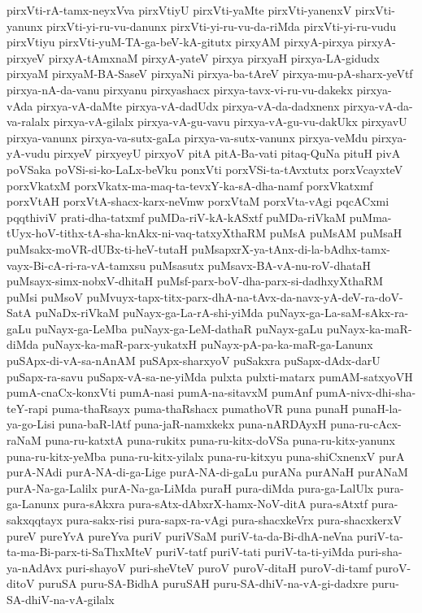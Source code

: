 {pirxVti-rA-tamx-neyxVva
pirxVtiyU
pirxVti-yaMte
pirxVti-yanenxV
pirxVti-yanunx
pirxVti-yi-ru-vu-danunx
pirxVti-yi-ru-vu-da-riMda
pirxVti-yi-ru-vudu
pirxVtiyu
pirxVti-yuM-TA-ga-beV-kA-gitutx
pirxyAM
pirxyA-pirxya
pirxyA-pirxyeV
pirxyA-tAmxnaM
pirxyA-yateV
pirxya
pirxyaH
pirxya-LA-gidudx
pirxyaM
pirxyaM-BA-SaseV
pirxyaNi
pirxya-ba-tAreV
pirxya-mu-pA-sharx-yeVtf
pirxya-nA-da-vanu
pirxyanu
pirxyashacx
pirxya-tavx-vi-ru-vu-dakekx
pirxya-vAda
pirxya-vA-daMte
pirxya-vA-dadUdx
pirxya-vA-da-dadxnenx
pirxya-vA-da-va-ralalx
pirxya-vA-gilalx
pirxya-vA-gu-vavu
pirxya-vA-gu-vu-dakUkx
pirxyavU
pirxya-vanunx
pirxya-va-sutx-gaLa
pirxya-va-sutx-vanunx
pirxya-veMdu
pirxya-yA-vudu
pirxyeV
pirxyeyU
pirxyoV
pitA
pitA-Ba-vati
pitaq-QuNa
pituH
pivA
poVSaka
poVSi-si-ko-LaLx-beVku
ponxVti
porxVSi-ta-tAvxtutx
porxVcayxteV
porxVkatxM
porxVkatx-ma-maq-ta-tevxY-ka-sA-dha-namf
porxVkatxmf
porxVtAH
porxVtA-shacx-karx-neVmw
porxVtaM
porxVta-vAgi
pqcACxmi
pqqthiviV
prati-dha-tatxmf
puMDa-riV-kA-kASxtf
puMDa-riVkaM
puMma-tUyx-hoV-tithx-tA-sha-knAkx-ni-vaq-tatxyXthaRM
puMsA
puMsAM
puMsaH
puMsakx-moVR-dUBx-ti-heV-tutaH
puMsapxrX-ya-tAnx-di-la-bAdhx-tamx-vayx-Bi-cA-ri-ra-vA-tamxsu
puMsasutx
puMsavx-BA-vA-nu-roV-dhataH
puMsayx-simx-nobxV-dhitaH
puMsf-parx-boV-dha-parx-si-dadhxyXthaRM
puMsi
puMsoV
puMvuyx-tapx-titx-parx-dhA-na-tAvx-da-navx-yA-deV-ra-doV-SatA
puNaDx-riVkaM
puNayx-ga-La-rA-shi-yiMda
puNayx-ga-La-saM-sAkx-ra-gaLu
puNayx-ga-LeMba
puNayx-ga-LeM-dathaR
puNayx-gaLu
puNayx-ka-maR-diMda
puNayx-ka-maR-parx-yukatxH
puNayx-pA-pa-ka-maR-ga-Lanunx
puSApx-di-vA-sa-nAnAM
puSApx-sharxyoV
puSakxra
puSapx-dAdx-darU
puSapx-ra-savu
puSapx-vA-sa-ne-yiMda
pulxta
pulxti-matarx
pumAM-satxyoVH
pumA-cnaCx-konxVti
pumA-nasi
pumA-na-sitavxM
pumAnf
pumA-nivx-dhi-sha-teY-rapi
puma-thaRsayx
puma-thaRshacx
pumathoVR
puna
punaH
punaH-la-ya-go-Lisi
puna-baR-lAtf
puna-jaR-namxkekx
puna-nARDAyxH
puna-ru-cAcx-raNaM
puna-ru-katxtA
puna-rukitx
puna-ru-kitx-doVSa
puna-ru-kitx-yanunx
puna-ru-kitx-yeMba
puna-ru-kitx-yilalx
puna-ru-kitxyu
puna-shiCxnenxV
purA
purA-NAdi
purA-NA-di-ga-Lige
purA-NA-di-gaLu
purANa
purANaH
purANaM
purA-Na-ga-Lalilx
purA-Na-ga-LiMda
puraH
pura-diMda
pura-ga-LalUlx
pura-ga-Lanunx
pura-sAkxra
pura-sAtx-dAbxrX-hamx-NoV-ditA
pura-sAtxtf
pura-sakxqqtayx
pura-sakx-risi
pura-sapx-ra-vAgi
pura-shacxkeVrx
pura-shacxkerxV
pureV
pureYvA
pureYva
puriV
puriVSaM
puriV-ta-da-Bi-dhA-neVna
puriV-ta-ta-ma-Bi-parx-ti-SaThxMteV
puriV-tatf
puriV-tati
puriV-ta-ti-yiMda
puri-sha-ya-nAdAvx
puri-shayoV
puri-sheVteV
puroV
puroV-ditaH
puroV-di-tamf
puroV-ditoV
puruSA
puru-SA-BidhA
puruSAH
puru-SA-dhiV-na-vA-gi-dadxre
puru-SA-dhiV-na-vA-gilalx
}
